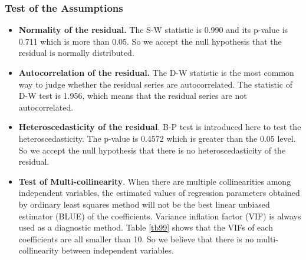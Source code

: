 \documentclass[12pt, a4paper]{article}
\begin{document}
\begin{spacing}{1.5}
\subsubsection{Test of the Assumptions}
\begin{itemize}
\item[(1)] \textbf{Normality of the residual.} The S-W statistic is 0.990 and its p-value is 0.711 which is more than 0.05. So we accept the null hypothesis that the residual is normally distributed\cite{NORMAL}.
\item[(2)] \textbf{Autocorrelation of the residual.} The D-W statistic is the most common way to judge whether the residual series are autocorrelated. The statistic of D-W test is 1.956, which means that the residual series are not autocorrelated.
\item[(3)] \textbf{Heteroscedasticity of the residual}. B-P test is introduced here to test the heteroscedasticity\cite{9}. The p-value is 0.4572 which is greater than the 0.05 level. So we accept the null hypothesis that there is no heteroscedasticity of the residual.
\item[(4)] \textbf{Test of Multi-collinearity}. When there are multiple collinearities among independent variables, the estimated values of regression parameters obtained by ordinary least squares method will not be the best linear unbiased estimator (BLUE) of the coefficients.  Variance inflation factor (VIF) is always used as a diagnostic method. Table \ref{tb99} shows that the VIFs of each coefficients are all smaller than 10\cite{9}. So we believe that there is no multi-collinearity between independent variables.
\begin{table}[!ht]
\centering
{}
\caption{Collinearity Statistics}
\label{tb99}
\end{table}
\end{itemize}
\newpage

\end{spacing}
\end{document}
